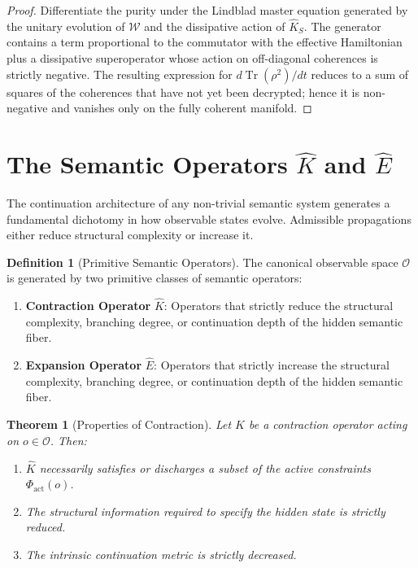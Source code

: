 \documentclass[12pt,anyside]{book}
\theoremstyle{plain}
\newtheorem{theorem}{Theorem}[chapter]
\theoremstyle{definition}
\newtheorem{definition}{Definition}[chapter]
\newcommand{\W}{\mathcal{W}}          %
\newcommand{\Khat}{\hat{K}_S}          %
\newcommand{\Ehat}{\hat{E}}            %
\newcommand{\Ocal}{\mathcal{O}}        %
\begin{document}
\begin{proof}
Differentiate the purity under the Lindblad master equation generated by the unitary evolution of $\W$ and the dissipative action of $\Khat$. The generator contains a term proportional to the commutator with the effective Hamiltonian plus a dissipative superoperator whose action on off-diagonal coherences is strictly negative. The resulting expression for $d\operatorname{Tr}(\rho^2)/dt$ reduces to a sum of squares of the coherences that have not yet been decrypted; hence it is non-negative and vanishes only on the fully coherent manifold.
\end{proof}

\section{The Semantic Operators $\hat{K}$ and $\Ehat$}

The continuation architecture of any non-trivial semantic system generates a fundamental dichotomy in how observable states evolve. Admissible propagations either reduce structural complexity or increase it.

\begin{definition}[Primitive Semantic Operators]\label{def:semops}
The canonical observable space $\Ocal$ is generated by two primitive classes of semantic operators:
\begin{enumerate}
\item \textbf{Contraction Operator} $\hat{K}$: Operators that strictly reduce the structural complexity, branching degree, or continuation depth of the hidden semantic fiber.
\item \textbf{Expansion Operator} $\Ehat$: Operators that strictly increase the structural complexity, branching degree, or continuation depth of the hidden semantic fiber.
\end{enumerate}
\end{definition}

\begin{theorem}[Properties of Contraction]\label{thm:contract}
Let $\hat{K}$ be a contraction operator acting on $o \in \Ocal$. Then:
\begin{enumerate}
\item $\hat{K}$ necessarily satisfies or discharges a subset of the active constraints $\Phi_{\mathrm{act}}(o)$.
\item The structural information required to specify the hidden state is strictly reduced.
\item The intrinsic continuation metric is strictly decreased.
\end{enumerate}
\end{theorem}
\end{document}
